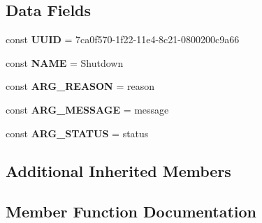 \subsection*{Data Fields}
\begin{DoxyCompactItemize}
\item 
\hypertarget{class_able_polecat___command___shutdown_a74b892c8c0b86bf9d04c5819898c51e7}{}const {\bfseries U\+U\+I\+D} = \textquotesingle{}7ca0f570-\/1f22-\/11e4-\/8c21-\/0800200c9a66\textquotesingle{}\label{class_able_polecat___command___shutdown_a74b892c8c0b86bf9d04c5819898c51e7}

\item 
\hypertarget{class_able_polecat___command___shutdown_a244352f035b82b20b0efa506167fd862}{}const {\bfseries N\+A\+M\+E} = \textquotesingle{}Shutdown\textquotesingle{}\label{class_able_polecat___command___shutdown_a244352f035b82b20b0efa506167fd862}

\item 
\hypertarget{class_able_polecat___command___shutdown_a7a37425542890863769ee7c83cea197b}{}const {\bfseries A\+R\+G\+\_\+\+R\+E\+A\+S\+O\+N} = \textquotesingle{}reason\textquotesingle{}\label{class_able_polecat___command___shutdown_a7a37425542890863769ee7c83cea197b}

\item 
\hypertarget{class_able_polecat___command___shutdown_a28892dbb83f30610aee932c8b4f38b73}{}const {\bfseries A\+R\+G\+\_\+\+M\+E\+S\+S\+A\+G\+E} = \textquotesingle{}message\textquotesingle{}\label{class_able_polecat___command___shutdown_a28892dbb83f30610aee932c8b4f38b73}

\item 
\hypertarget{class_able_polecat___command___shutdown_af3f88636b0e76d1e427cb55e7cdda732}{}const {\bfseries A\+R\+G\+\_\+\+S\+T\+A\+T\+U\+S} = \textquotesingle{}status\textquotesingle{}\label{class_able_polecat___command___shutdown_af3f88636b0e76d1e427cb55e7cdda732}

\end{DoxyCompactItemize}
\subsection*{Additional Inherited Members}


\subsection{Member Function Documentation}
\hypertarget{class_able_polecat___command___shutdown_acfaa3a96d0cb5a4c0d4d710dcba41e9e}{}
